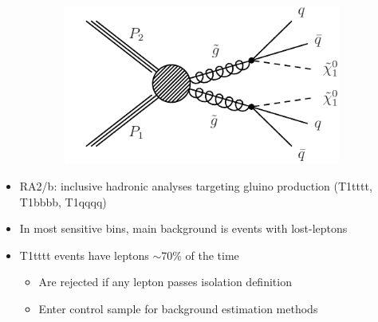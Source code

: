 \documentclass{beamer}
\begin{document}
\begin{frame}
\begin{figure}
\begin{subfigure}[b]{0.3\textwidth}
      \includegraphics[width=\textwidth]{figures/jacks_Studies/T1qqqq}
    \end{subfigure}
  \end{figure}
  \begin{itemize}
  \item RA2/b: inclusive hadronic analyses targeting gluino production (T1tttt, T1bbbb, T1qqqq)
  \item In most sensitive bins, main background is \ttbar events with lost-leptons
  \item T1tttt events have leptons $\sim 70 \%$ of the time
  \begin{itemize}
   \item Are rejected if any lepton passes isolation definition
   \item Enter control sample for background estimation methods
  \end{itemize}  
  \end{itemize}
\end{frame}
\end{document}
